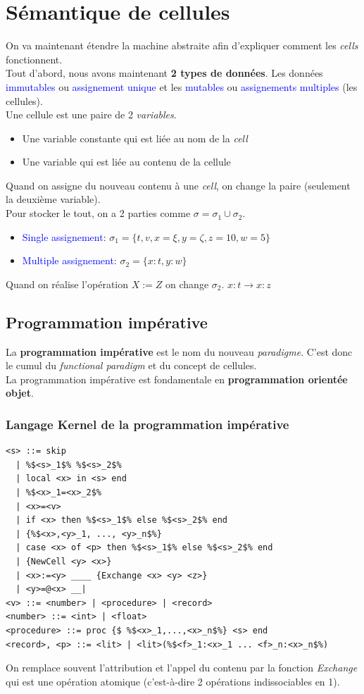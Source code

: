 \documentclass{report}
\begin{document}
\section{Sémantique de cellules}
On va maintenant étendre la machine abstraite afin d'expliquer comment les \textit{cells} fonctionnent.\\
Tout d'abord, nous avons maintenant \textbf{2 types de données}. Les données \textcolor{blue}{immutables} ou \textcolor{blue}{assignement unique} et les \textcolor{blue}{mutables} ou \textcolor{blue}{assignements multiples} (les cellules).\\
Une cellule est une paire de 2 \textit{variables}.
\begin{itemize}
\item Une variable constante qui est liée au nom de la \textit{cell}
\item Une variable qui est liée au contenu de la cellule
\end{itemize}
Quand on assigne du nouveau contenu à une \textit{cell}, on change la paire (seulement la deuxième variable).\\

Pour stocker le tout, on a 2 parties comme $\sigma = \sigma_1 \cup \sigma_2$.
\begin{itemize}
\item \textcolor{blue}{Single assignement}: $\sigma_1 = \{t,v,x=\xi,y = \zeta , z = 10, w = 5 \}$
\item \textcolor{blue}{Multiple assignement}: $\sigma_2 = \{x:t, y:w\}$
\end{itemize}
Quand on réalise l'opération $X:=Z$ on change $\sigma_2$. $x:t \rightarrow x:z$

\subsection{Programmation impérative}
La \textbf{programmation impérative} est le nom du nouveau \textit{paradigme}. C'est donc le cumul du \textit{functional paradigm} et du concept de cellules.\\
La programmation impérative est fondamentale en \textbf{programmation orientée objet}.

\subsubsection{Langage Kernel de la programmation impérative}
\begin{lstlisting}[escapechar=\%]
<s> ::= skip 
  | %$<s>_1$% %$<s>_2$% 
  | local <x> in <s> end 
  | %$<x>_1=<x>_2$%
  | <x>=<v> 
  | if <x> then %$<s>_1$% else %$<s>_2$% end 
  | {%$<x>,<y>_1, ..., <y>_n$%} 
  | case <x> of <p> then %$<s>_1$% else %$<s>_2$% end 
  | {NewCell <y> <x>} 
  | <x>:=<y> ____ {Exchange <x> <y> <z>}
  | <y>=@<x> __|
<v> ::= <number> | <procedure> | <record> 
<number> ::= <int> | <float> 
<procedure> ::= proc {$ %$<x>_1,...,<x>_n$%} <s> end
<record>, <p> ::= <lit> | <lit>(%$<f>_1:<x>_1 ... <f>_n:<x>_n$%)
\end{lstlisting}
On remplace souvent l'attribution et l'appel du contenu par la fonction \textit{Exchange} qui est une opération atomique (c'est-à-dire 2 opérations indissociables en 1).
\end{document}
